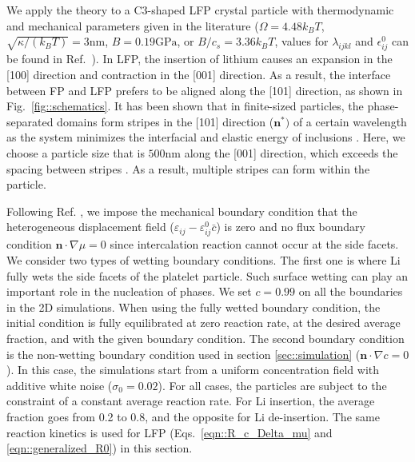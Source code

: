 \documentclass[reprint,aps,pre,superscriptaddress]{revtex4-2}
\begin{document}
We apply the theory to a C3-shaped LFP crystal particle\cite{Smith2012} with thermodynamic and mechanical parameters given in the literature \cite{Maxisch2006,Cogswell2012,Deng2022} ($\Omega=4.48 k_B T$, $\sqrt{\kappa/(k_B T)}=3\text{nm}$, $B=0.19\text{GPa}$, or $B/c_s=3.36 k_B T$, values for $\lambda_{ijkl}$ and $\epsilon_{ij}^0$ can be found in Ref.~\cite{Zhao2023LFP}).
In LFP, the insertion of lithium causes an expansion in the [100] direction and contraction in the [001] direction. As a result, the interface between FP and LFP prefers to be aligned along the [101] direction, as shown in Fig.~\ref{fig::schematics}.
It has been shown that in finite-sized particles, the phase-separated domains form stripes in the [101] direction ($\mathbf{n}^*)$ of a certain wavelength as the system minimizes the interfacial and elastic energy of inclusions \cite{khachaturyan2013theory,Cogswell2012,Cogswell2018a}. Here, we choose a particle size that is $500\text{nm}$ along the [001] direction, which exceeds the spacing between stripes \cite{Cogswell2018a}. As a result, multiple stripes can form within the particle.

Following Ref. \cite{Cogswell2012}, we impose the mechanical boundary condition that the heterogeneous displacement field ($\varepsilon_{ij}-\varepsilon_{ij}^0\bar{c}$) is zero \cite{khachaturyan2013theory} and no flux boundary condition $\mathbf{n}\cdot \nabla \mu=0$ since intercalation reaction cannot occur at the side facets.
We consider two types of wetting boundary conditions. The first one is where Li fully wets the side facets of the platelet particle\cite{Cogswell2013,Cogswell2018a}. Such surface wetting can play an important role in the nucleation of phases. We set $c=0.99$ on all the boundaries in the 2D simulations.
When using the fully wetted boundary condition, the initial condition is fully equilibrated at zero reaction rate, at the desired average fraction, and with the given boundary condition.
The second boundary condition is the non-wetting boundary condition used in section \ref{sec::simulation} ($\mathbf{n} \cdot \nabla c=0$).
In this case, the simulations start from a uniform concentration field with additive white noise ($\sigma_0=0.02$).
For all cases, the particles are subject to the constraint of a constant average reaction rate. For Li insertion, the average fraction goes from 0.2 to 0.8, and the opposite for Li de-insertion.
The same reaction kinetics is used for LFP (Eqs.~\ref{eqn::R_c_Delta_mu} and \ref{eqn::generalized_R0}) in this section.
\end{document}
